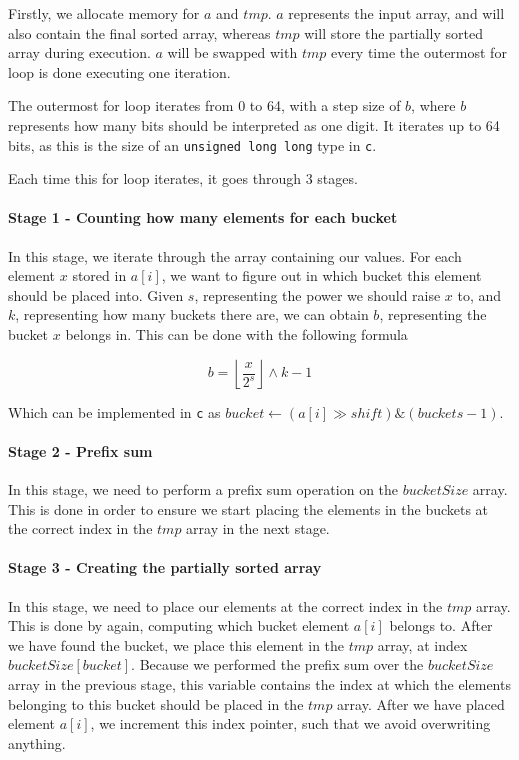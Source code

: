 \documentclass{article}
\begin{document}
Firstly, we allocate memory for \( a \) and \( tmp \). \( a \) represents the input array, and will also contain the final sorted array, whereas \( tmp \) will store the partially sorted array during execution. \( a \) will be swapped with \( tmp \) every time the outermost for loop is done executing one iteration.
\medskip

The outermost for loop iterates from 0 to 64, with a step size of \( b \), where \( b \) represents how many bits should be interpreted as one digit. It iterates up to 64 bits, as this is the size of an \texttt{unsigned long long} type in \texttt{c}.
\medskip

Each time this for loop iterates, it goes through 3 stages.

\paragraph{Stage 1 - Counting how many elements for each bucket}
In this stage, we iterate through the array containing our values. For each element \( x \) stored in \( a[i] \), we want to figure out in which bucket this element should be placed into. Given \( s \), representing the power we should raise \( x \) to, and \( k \), representing how many buckets there are, we can obtain \( b \), representing the bucket \( x \) belongs in. This can be done with the following formula

\[ b = \left\lfloor\frac{x}{2^{s}}\right\rfloor \wedge k-1 \]

Which can be implemented in \texttt{c} as \(bucket \leftarrow (a[i] \gg shift) \& (buckets - 1)\).

\paragraph{Stage 2 - Prefix sum}
In this stage, we need to perform a prefix sum operation on the \( bucketSize \) array. This is done in order to ensure we start placing the elements in the buckets at the correct index in the \( tmp \) array in the next stage.

\paragraph{Stage 3 - Creating the partially sorted array}
In this stage, we need to place our elements at the correct index in the \( tmp \) array. This is done by again, computing which bucket element \( a[i] \) belongs to. After we have found the bucket, we place this element in the \( tmp \) array, at index \( bucketSize[bucket] \). Because we performed the prefix sum over the \( bucketSize \) array in the previous stage, this variable contains the index at which the elements belonging to this bucket should be placed in the \( tmp \) array. After we have placed element \( a[i] \), we increment this index pointer, such that we avoid overwriting anything.

\end{document}
